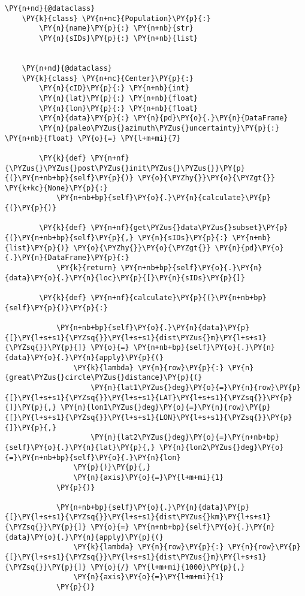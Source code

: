 \begin{tcolorbox}[breakable, size=fbox, boxrule=1pt, pad at break*=1mm,colback=cellbackground, colframe=cellborder]
\begin{Verbatim}[commandchars=\\\{\}]
    \PY{n+nd}{@dataclass}
    \PY{k}{class} \PY{n+nc}{Population}\PY{p}{:}
        \PY{n}{name}\PY{p}{:} \PY{n+nb}{str}
        \PY{n}{sIDs}\PY{p}{:} \PY{n+nb}{list}
    
    
    \PY{n+nd}{@dataclass}
    \PY{k}{class} \PY{n+nc}{Center}\PY{p}{:}
        \PY{n}{cID}\PY{p}{:} \PY{n+nb}{int}
        \PY{n}{lat}\PY{p}{:} \PY{n+nb}{float}
        \PY{n}{lon}\PY{p}{:} \PY{n+nb}{float}
        \PY{n}{data}\PY{p}{:} \PY{n}{pd}\PY{o}{.}\PY{n}{DataFrame}
        \PY{n}{paleo\PYZus{}azimuth\PYZus{}uncertainty}\PY{p}{:} \PY{n+nb}{float} \PY{o}{=} \PY{l+m+mi}{7}
    
        \PY{k}{def} \PY{n+nf}{\PYZus{}\PYZus{}post\PYZus{}init\PYZus{}\PYZus{}}\PY{p}{(}\PY{n+nb+bp}{self}\PY{p}{)} \PY{o}{\PYZhy{}}\PY{o}{\PYZgt{}} \PY{k+kc}{None}\PY{p}{:}
            \PY{n+nb+bp}{self}\PY{o}{.}\PY{n}{calculate}\PY{p}{(}\PY{p}{)}
    
        \PY{k}{def} \PY{n+nf}{get\PYZus{}data\PYZus{}subset}\PY{p}{(}\PY{n+nb+bp}{self}\PY{p}{,} \PY{n}{sIDs}\PY{p}{:} \PY{n+nb}{list}\PY{p}{)} \PY{o}{\PYZhy{}}\PY{o}{\PYZgt{}} \PY{n}{pd}\PY{o}{.}\PY{n}{DataFrame}\PY{p}{:}
            \PY{k}{return} \PY{n+nb+bp}{self}\PY{o}{.}\PY{n}{data}\PY{o}{.}\PY{n}{loc}\PY{p}{[}\PY{n}{sIDs}\PY{p}{]}
    
        \PY{k}{def} \PY{n+nf}{calculate}\PY{p}{(}\PY{n+nb+bp}{self}\PY{p}{)}\PY{p}{:}
    
            \PY{n+nb+bp}{self}\PY{o}{.}\PY{n}{data}\PY{p}{[}\PY{l+s+s1}{\PYZsq{}}\PY{l+s+s1}{dist\PYZus{}m}\PY{l+s+s1}{\PYZsq{}}\PY{p}{]} \PY{o}{=} \PY{n+nb+bp}{self}\PY{o}{.}\PY{n}{data}\PY{o}{.}\PY{n}{apply}\PY{p}{(}
                \PY{k}{lambda} \PY{n}{row}\PY{p}{:} \PY{n}{great\PYZus{}circle\PYZus{}distance}\PY{p}{(}
                    \PY{n}{lat1\PYZus{}deg}\PY{o}{=}\PY{n}{row}\PY{p}{[}\PY{l+s+s1}{\PYZsq{}}\PY{l+s+s1}{LAT}\PY{l+s+s1}{\PYZsq{}}\PY{p}{]}\PY{p}{,} \PY{n}{lon1\PYZus{}deg}\PY{o}{=}\PY{n}{row}\PY{p}{[}\PY{l+s+s1}{\PYZsq{}}\PY{l+s+s1}{LON}\PY{l+s+s1}{\PYZsq{}}\PY{p}{]}\PY{p}{,}
                    \PY{n}{lat2\PYZus{}deg}\PY{o}{=}\PY{n+nb+bp}{self}\PY{o}{.}\PY{n}{lat}\PY{p}{,} \PY{n}{lon2\PYZus{}deg}\PY{o}{=}\PY{n+nb+bp}{self}\PY{o}{.}\PY{n}{lon}
                \PY{p}{)}\PY{p}{,}
                \PY{n}{axis}\PY{o}{=}\PY{l+m+mi}{1}
            \PY{p}{)}
    
            \PY{n+nb+bp}{self}\PY{o}{.}\PY{n}{data}\PY{p}{[}\PY{l+s+s1}{\PYZsq{}}\PY{l+s+s1}{dist\PYZus{}km}\PY{l+s+s1}{\PYZsq{}}\PY{p}{]} \PY{o}{=} \PY{n+nb+bp}{self}\PY{o}{.}\PY{n}{data}\PY{o}{.}\PY{n}{apply}\PY{p}{(}
                \PY{k}{lambda} \PY{n}{row}\PY{p}{:} \PY{n}{row}\PY{p}{[}\PY{l+s+s1}{\PYZsq{}}\PY{l+s+s1}{dist\PYZus{}m}\PY{l+s+s1}{\PYZsq{}}\PY{p}{]} \PY{o}{/} \PY{l+m+mi}{1000}\PY{p}{,}
                \PY{n}{axis}\PY{o}{=}\PY{l+m+mi}{1}
            \PY{p}{)}
    

\end{Verbatim}
\end{tcolorbox}
